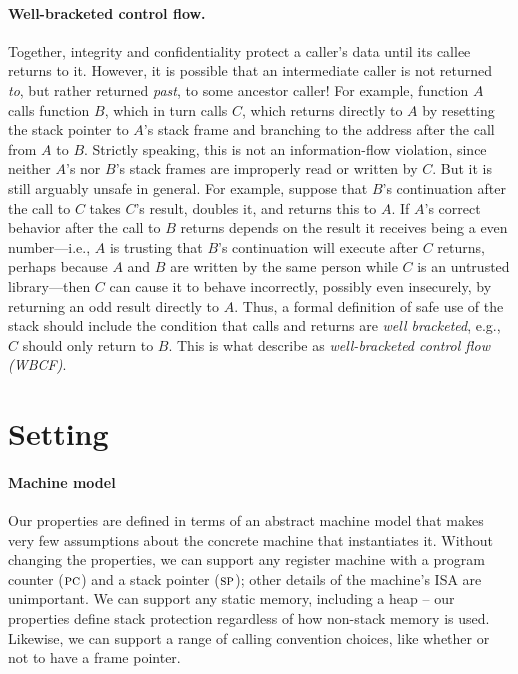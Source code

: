 \documentclass[acmsmall,review,anonymous]{acmart}\settopmatter{printfolios=true,printccs=false,printacmref=false}
\begin{document}
\paragraph{Well-bracketed control flow.} Together,
integrity and confidentiality protect a caller's data until its callee
returns to it. However, it is possible that an intermediate caller is not
returned {\em to}, but rather returned {\em past}, to some ancestor caller!
For example, function $A$ calls function $B$, which in turn calls $C$, which
returns directly to $A$ by resetting the stack pointer to $A$'s stack frame
and branching to the address after the call from $A$ to $B$.  Strictly
speaking, this is not an information-flow violation, since neither $A$'s nor
$B$'s stack frames are improperly read or written by $C$.  But it is still
arguably unsafe in general.  For example, suppose that $B$'s continuation
after the call to $C$ takes $C$'s result, doubles it, and returns this to
$A$.  If $A$'s correct behavior after the call to $B$ returns depends on the
result it receives being a even number---i.e., $A$ is trusting that $B$'s
continuation will execute after $C$ returns, perhaps because $A$ and $B$ are
written by the same person while $C$ is an untrusted library---then $C$ can
cause it to behave incorrectly, possibly even insecurely, by returning an
odd result directly to $A$.
%
Thus, a formal definition of safe use of the stack should include the
condition that calls and returns are {\em well bracketed}, e.g., $C$ should
only return to $B$.  This is what \citet{SkorstengaardSTKJFP} describe
as \emph{well-bracketed control flow (WBCF)}.

\section{Setting}
\label{sec:setup}


\paragraph*{Machine model}
Our properties are defined in terms of an abstract machine model that makes very few
assumptions about the concrete machine that instantiates it. Without changing the
properties, we can support any register
machine with a program counter (\(\textsc{pc}\)) and a stack pointer (\(\textsc{sp}\)); other
details of the machine's ISA are unimportant. We can support any static memory,
including a heap -- our properties define stack protection regardless of how
non-stack memory is used. Likewise, we can support a range of calling convention
choices, like whether or not to have a frame pointer.
\end{document}
